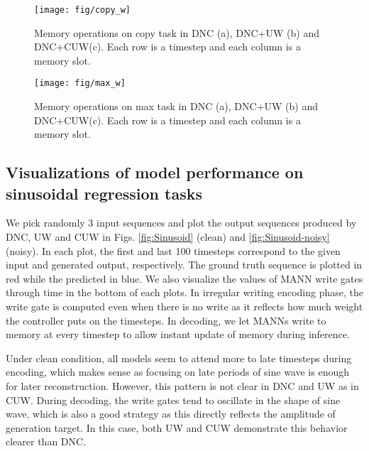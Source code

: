 \begin{figure}
\begin{centering}
\texttt{[image: fig/copy\_w]}
\par\end{centering}
\caption{Memory operations on copy task in DNC (a), DNC+UW (b) and DNC+CUW(c).
Each row is a timestep and each column is a memory slot.\label{fig:Memory-operations-on}}

\end{figure}
\begin{figure}
\begin{centering}
\texttt{[image: fig/max\_w]}
\par\end{centering}
\caption{Memory operations on max task in DNC (a), DNC+UW (b) and DNC+CUW(c).
Each row is a timestep and each column is a memory slot.\label{fig:Memory-operations-on-1}}
\end{figure}

\subsection{Visualizations of model performance on sinusoidal regression tasks\label{subsec:Visualizations-of-model}}

We pick randomly 3 input sequences and plot the output sequences produced
by DNC, UW and CUW in Figs. \ref{fig:Sinusoid} (clean) and \ref{fig:Sinusoid-noisy}
(noisy). In each plot, the first and last 100 timesteps correspond
to the given input and generated output, respectively. The ground
truth sequence is plotted in red while the predicted in blue. We also
visualize the values of MANN write gates through time in the bottom
of each plots. In irregular writing encoding phase, the write gate
is computed even when there is no write as it reflects how much weight
the controller puts on the timesteps. In decoding, we let MANNs write
to memory at every timestep to allow instant update of memory during
inference. 

Under clean condition, all models seem to attend more to late timesteps
during encoding, which makes sense as focusing on late periods of
sine wave is enough for later reconstruction. However, this pattern
is not clear in DNC and UW as in CUW. During decoding, the write gates
tend to oscillate in the shape of sine wave, which is also a good
strategy as this directly reflects the amplitude of generation target.
In this case, both UW and CUW demonstrate this behavior clearer than
DNC. 

